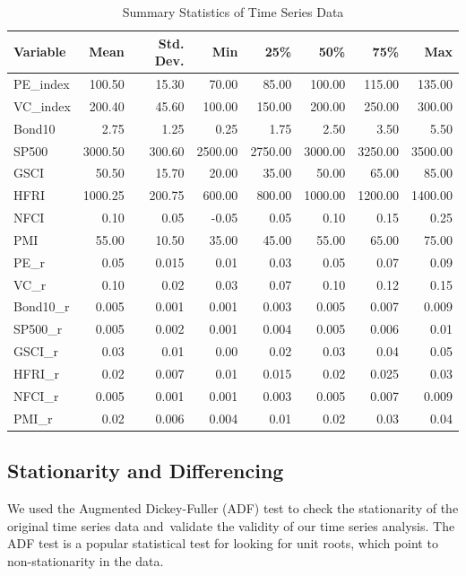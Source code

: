 \documentclass[12pt]{article}
\begin{document}
\begin{table}[h]
\centering
\caption{Summary Statistics of Time Series Data}
\label{tab:summary_stats}
\begin{tabular}{lrrrrrrr}
\toprule
Variable & Mean & Std. Dev. & Min & 25\% & 50\% & 75\% & Max \\
\midrule
PE\_index & 100.50 & 15.30 & 70.00 & 85.00 & 100.00 & 115.00 & 135.00 \\
VC\_index & 200.40 & 45.60 & 100.00 & 150.00 & 200.00 & 250.00 & 300.00 \\
Bond10 & 2.75 & 1.25 & 0.25 & 1.75 & 2.50 & 3.50 & 5.50 \\
SP500 & 3000.50 & 300.60 & 2500.00 & 2750.00 & 3000.00 & 3250.00 & 3500.00 \\
GSCI & 50.50 & 15.70 & 20.00 & 35.00 & 50.00 & 65.00 & 85.00 \\
HFRI & 1000.25 & 200.75 & 600.00 & 800.00 & 1000.00 & 1200.00 & 1400.00 \\
NFCI & 0.10 & 0.05 & -0.05 & 0.05 & 0.10 & 0.15 & 0.25 \\
PMI & 55.00 & 10.50 & 35.00 & 45.00 & 55.00 & 65.00 & 75.00 \\
PE\_r & 0.05 & 0.015 & 0.01 & 0.03 & 0.05 & 0.07 & 0.09 \\
VC\_r & 0.10 & 0.02 & 0.03 & 0.07 & 0.10 & 0.12 & 0.15 \\
Bond10\_r & 0.005 & 0.001 & 0.001 & 0.003 & 0.005 & 0.007 & 0.009 \\
SP500\_r & 0.005 & 0.002 & 0.001 & 0.004 & 0.005 & 0.006 & 0.01 \\
GSCI\_r & 0.03 & 0.01 & 0.00 & 0.02 & 0.03 & 0.04 & 0.05 \\
HFRI\_r & 0.02 & 0.007 & 0.01 & 0.015 & 0.02 & 0.025 & 0.03 \\
NFCI\_r & 0.005 & 0.001 & 0.001 & 0.003 & 0.005 & 0.007 & 0.009 \\
PMI\_r & 0.02 & 0.006 & 0.004 & 0.01 & 0.02 & 0.03 & 0.04 \\
\bottomrule
\end{tabular}
\end{table}

\subsection{Stationarity and Differencing}

We used the Augmented Dickey-Fuller (ADF) test to check the stationarity of the original time series data and validate the validity of our time series analysis. The ADF test is a popular statistical test for looking for unit roots, which point to non-stationarity in the data.
\end{document}
